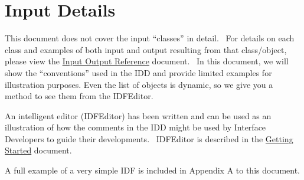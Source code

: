 \chapter{Input Details}\label{input-details}

This document does not cover the input ``classes'' in detail.~ For details on each class and examples of both input and output resulting from that class/object, please view the \href{https://energyplus.readthedocs.io/en/latest/guides/input-output-reference/index.html}{Input Output Reference} document.~ In this document, we will show the ``conventions'' used in the IDD and provide limited examples for illustration purposes. Even the list of objects is dynamic, so we give you a method to see them from the IDFEditor.

An intelligent editor (IDFEditor) has been written and can be used as an illustration of how the comments in the IDD might be used by Interface Developers to guide their developments.~ IDFEditor is described in the \href{https://energyplus.readthedocs.io/en/latest/guides/getting-started/index.html}{Getting Started} document.

A full example of a very simple IDF is included in Appendix A to this document.
